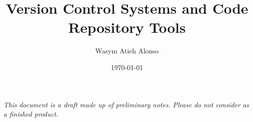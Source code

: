 \title{Version Control Systems and Code Repository Tools}
\author{Wasym Atieh Alonso}
\date{\today}
\maketitle

\pagebreak

\textit{This document is a draft made up of preliminary notes. Please do not consider as a finished product.}

\pagebreak